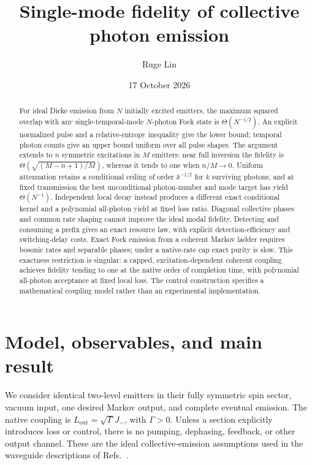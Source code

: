 \documentclass[11pt,a4paper]{article}
\title{Single-mode fidelity of collective photon emission}
\author{Ruge Lin}
\date{17 October 2026}
\begin{document}
\maketitle
\begin{abstract}
For ideal Dicke emission from \(N\) initially excited emitters, the
maximum squared overlap with any single-temporal-mode \(N\)-photon
Fock state is \(\Theta(N^{-1/2})\). An explicit normalized pulse and
a relative-entropy inequality give the lower bound; temporal photon
counts give an upper bound uniform over all pulse shapes. The argument
extends to \(n\) symmetric excitations in \(M\) emitters: near full
inversion the fidelity is \(\Theta(\sqrt{(M-n+1)/M})\), whereas it
tends to one when \(n/M\to0\). Uniform attenuation retains a
conditional ceiling of order \(k^{-1/2}\) for \(k\) surviving photons,
and at fixed transmission the best unconditional photon-number and
mode target has yield \(\Theta(N^{-1})\). Independent local decay
instead produces a different exact conditional kernel and a
polynomial all-photon yield at fixed loss ratio. Diagonal collective
phases and common rate shaping cannot improve the ideal modal
fidelity. Detecting and consuming a prefix gives an exact resource
law, with explicit detection-efficiency and switching-delay costs.
Exact Fock emission from a coherent Markov ladder requires bosonic
rates and separable phases; under a native-rate cap exact purity is
slow. This exactness restriction is singular: a capped,
excitation-dependent coherent coupling achieves fidelity tending to
one at the native order of completion time, with polynomial
all-photon acceptance at fixed local loss. The control construction
specifies a mathematical coupling model rather than an experimental
implementation.
\end{abstract}

\section{Model, observables, and main result}
\label{sec:model}

We consider identical two-level emitters in their fully symmetric spin
sector, vacuum input, one desired Markov output, and complete eventual
emission. The native coupling is \(L_{\mathrm{out}}=\sqrt{\Gamma}J_-\),
with \(\Gamma>0\). Unless a section explicitly introduces loss or
control, there is no pumping, dephasing, feedback, or other output
channel. These are the ideal collective-emission assumptions used in
the waveguide descriptions of Refs.~\cite{paulisch,perarnau}.
\end{document}
